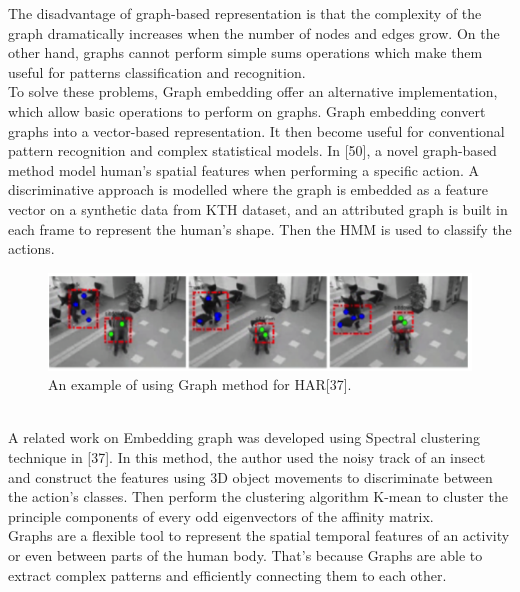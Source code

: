 The disadvantage of graph-based representation is that the complexity of the graph dramatically increases when the number of nodes and edges grow. On the other hand, graphs cannot perform simple sums operations which make them useful for patterns classification and recognition.\\

To solve these problems, Graph embedding offer an alternative implementation, which allow basic operations to perform on graphs. Graph embedding convert graphs into a vector-based representation. It then become useful for conventional pattern recognition and complex statistical models. In [50], a novel graph-based method model human’s spatial features when performing a specific action. A discriminative approach is modelled where the graph is embedded as a feature vector on a synthetic data from KTH dataset, and an attributed graph is built in each frame to represent the human’s shape. Then the HMM is used to classify the actions.
\begin{figure}[ht]
\centering
\includegraphics{Figures/gr1}
\decoRule
\caption[An example of using Graph method for HAR "37"]{An example of using Graph method for HAR[37].}
\label{fig:la}
\end{figure}\hfill \\

A related work on Embedding graph was developed using Spectral clustering technique in [37]. In this method, the author used the noisy track of an insect and construct the features using 3D object movements to discriminate between the action’s classes. Then perform the clustering algorithm K-mean to cluster the principle components of every odd eigenvectors of the affinity matrix.\\

Graphs are a flexible tool to represent the spatial temporal features of an activity or even between parts of the human body. That’s because Graphs are able to extract complex patterns and efficiently connecting them to each other. 
